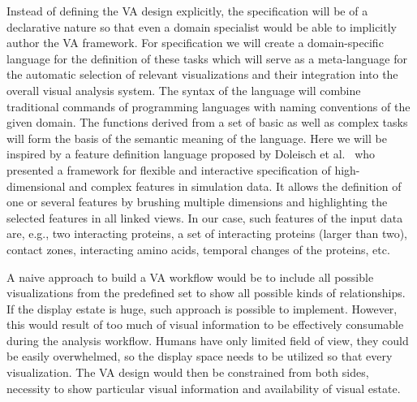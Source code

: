 \documentclass[11pt,a4paper,titlepage,oneside,onecolumn]{article}
\begin{document}
Instead of defining the VA design explicitly, the specification will be of a declarative nature so that even a domain specialist would be able to implicitly author the VA framework.
For specification we will create a domain-specific language for the definition of these tasks which will serve as a meta-language for the automatic selection of relevant visualizations and their integration into the overall visual analysis system. The syntax of the language will combine traditional commands of programming languages with naming conventions of the given domain. The functions derived from a set of basic as well as complex tasks will form the basis of the semantic meaning of the language. Here we will be inspired by a feature definition language proposed by Doleisch et al.~\cite{Doleisch} who presented a framework for flexible and interactive specification of high-dimensional and complex features in simulation data. It allows the definition of one or several features by brushing multiple dimensions and highlighting the selected features in all linked views.
In our case, such features of the input data are, e.g., two interacting proteins, a set of interacting proteins (larger than two), contact zones, interacting amino acids, temporal changes of the proteins, etc. 

A naive approach to build a VA workflow would be to include all possible visualizations from the predefined set to show all possible kinds of relationships. If the display estate is huge, such approach is possible to implement. However, this would result of too much of visual information to be effectively consumable during the analysis workflow. Humans have only limited field of view, they could be easily overwhelmed, so the display space needs to be utilized so that every visualization. The VA design would then be constrained from both sides, necessity to show particular visual information and availability of visual estate.

\end{document}
